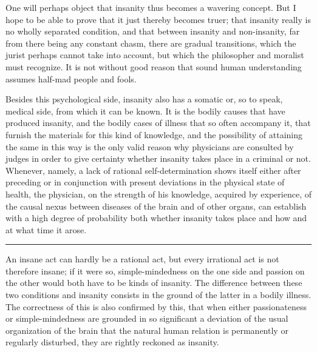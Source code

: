 \documentclass[12pt,a4paper,openany]{book}
\newcommand{\opage}[1]{\marginnote{\footnotesize\textit{[#1]}}}
\newcommand{\sectionrule}{\par\begin{center}\rule{4em}{0.4pt}\end{center}}
\begin{document}
One will perhaps object that insanity thus becomes a wavering concept. But I hope to
be able to prove that it just thereby becomes truer; that insanity really is no wholly
separated condition, and that between insanity and non-insanity, far from there being
any constant chasm, there are gradual transitions, which the jurist perhaps cannot
take into account, but which the philosopher and moralist must recognize. It is not
without good reason that sound human understanding assumes half-mad people and fools.

Besides this psychological side, insanity also has a somatic or, so to speak, medical
side, from which it can be known. It is the bodily causes that have produced
insanity, and the bodily cases of illness that so often accompany it, that furnish the
materials for this kind of
\setcounter{footnote}{0}%
\opage{143}knowledge, and the possibility of attaining the same in this way is the only valid
reason why physicians are consulted by judges in order to give certainty whether
insanity takes place in a criminal or not. Whenever, namely, a lack of rational
self-determination shows itself either after preceding or in conjunction with present
deviations in the physical state of health, the physician, on the strength of his
knowledge, acquired by experience, of the causal nexus between diseases of the brain
and of other organs, can establish with a high degree of probability both whether
insanity takes place and how and at what time it arose.

\sectionrule

An insane act can hardly be a rational act, but every irrational act is not therefore
insane; if it were so, simple-mindedness on the one side and passion on the other
would both have to be kinds of insanity. The difference between these two conditions
and insanity consists in the ground of the latter in a bodily illness. The correctness
of this is also confirmed by this, that when either passionateness or simple-mindedness
are grounded in so significant a deviation of the usual organization of the brain that
the natural human relation is permanently or regularly disturbed, they are rightly
reckoned as insanity.
\end{document}
